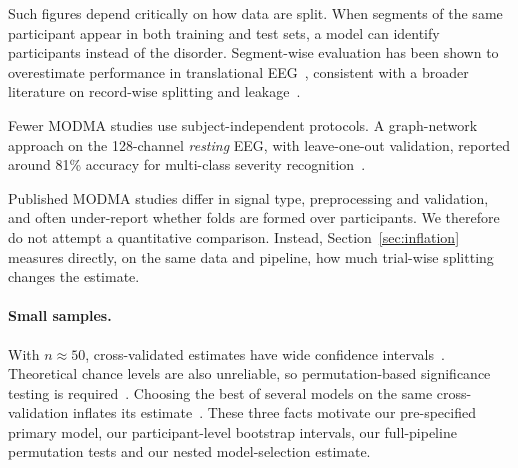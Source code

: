 Such figures depend critically on how data are split. When segments of the same participant appear in both
training and test sets, a model can identify participants instead of the disorder. Segment-wise evaluation has been
shown to overestimate performance in translational EEG~\cite{brookshire2024leakage}, consistent with a broader
literature on record-wise splitting and leakage~\cite{saeb2017need,kapoor2023leakage}.

Fewer MODMA studies use subject-independent protocols. A graph-network approach on the 128-channel \emph{resting}
EEG, with leave-one-out validation, reported around 81\% accuracy for multi-class severity
recognition~\cite{zhang2025depl}.

Published MODMA studies differ in signal type, preprocessing and validation, and often under-report whether folds are
formed over participants. We therefore do not attempt a quantitative comparison. Instead, Section~\ref{sec:inflation}
measures directly, on the same data and pipeline, how much trial-wise splitting changes the estimate.

\paragraph{Small samples.}
With $n\approx50$, cross-validated estimates have wide confidence intervals~\cite{varoquaux2018cross}. Theoretical
chance levels are also unreliable, so permutation-based significance testing is
required~\cite{combrisson2015exceeding}. Choosing the best of several models on the same cross-validation inflates its
estimate~\cite{cawley2010overfitting}. These three facts motivate our pre-specified primary model, our
participant-level bootstrap intervals, our full-pipeline permutation tests and our nested model-selection estimate.
